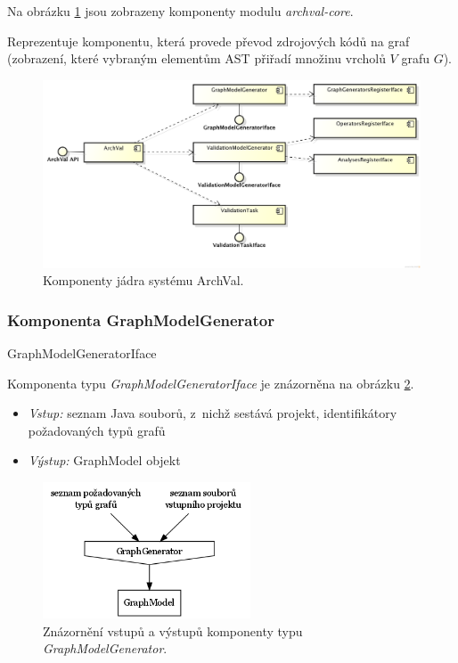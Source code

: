 Na obrázku \ref{design-archval_core} jsou zobrazeny komponenty modulu \emph{archval-core}.

Reprezentuje komponentu, která provede převod zdrojových kódů na graf (zobrazení, které vybraným elementům AST přiřadí množinu vrcholů $V$ grafu $G$).

\begin{figure}[h!]
  \centering
  \includegraphics[width=1.0\textwidth]{./uml/archval_core_cmp.png}
  \caption{Komponenty jádra systému ArchVal.\label{design-archval_core}}
\end{figure}

\subsubsection{Komponenta GraphModelGenerator}
GraphModelGeneratorIface

Komponenta typu \emph{GraphModelGeneratorIface} je znázorněna na obrázku \ref{design-graph_generator_io}.

\begin{itemize}
\item \emph{Vstup:} seznam Java souborů, z~nichž sestává projekt, identifikátory požadovaných typů grafů
\item \emph{Výstup:} GraphModel objekt
\end{itemize}

\begin{figure}[h!]
  \centering
  \includegraphics[width=0.55\textwidth]{./graphs/graph_generator_io_graph.png}
  \caption{Znázornění vstupů a výstupů komponenty typu \emph{GraphModelGenerator}.\label{design-graph_generator_io}}
\end{figure}

